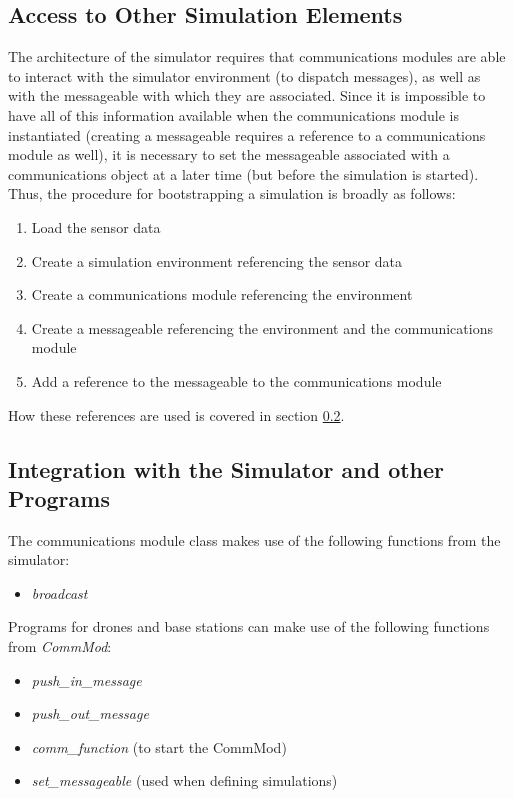 \subsection{Access to Other Simulation Elements}
		
The architecture of the simulator requires that communications modules are able to interact with the simulator environment (to dispatch messages), as well as with the messageable with which they are associated. Since it is impossible to have all of this information available when the communications module is instantiated (creating a messageable requires a reference to a communications module as well), it is necessary to set the messageable associated with a communications object at a later time (but before the simulation is started). Thus, the procedure for bootstrapping a simulation is broadly as follows:

\begin{enumerate}
	\item Load the sensor data
	\item Create a simulation environment referencing the sensor data
	\item Create a communications module referencing the environment
	\item Create a messageable referencing the environment and the communications module
	\item Add a reference to the messageable to the communications module
\end{enumerate}

How these references are used is covered in section \ref{int-sim}.

\subsection{Integration with the Simulator and other Programs}
\label{int-sim}
The communications module class makes use of the following functions from the simulator:

\begin{itemize}
\item \textit{broadcast}
\end{itemize}

Programs for drones and base stations can make use of the following functions from \textit{CommMod}:

\begin{itemize}
\item \textit{push\_in\_message}
\item \textit{push\_out\_message}
\item \textit{comm\_function} (to start the CommMod)
\item \textit{set\_messageable} (used when defining simulations)
\end{itemize}

